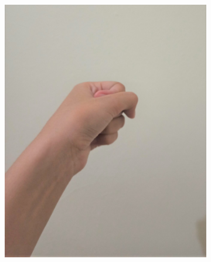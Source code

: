 \documentclass[conference]{IEEEtran}
\begin{document}
		\vspace{-2ex}
		\begin{figure} [h]
		\begin{center}
		\begin{subfigure}[t]{0.11\textwidth}
			\includegraphics[width=\textwidth]{img/pola1a.jpg}
			\caption{\label{fig:gs1a}}
		\end{subfigure}
		\hspace{0.1em}
		\begin{subfigure}[t]{0.11\textwidth}

\end{subfigure}
\end{center}
\end{figure}
\end{document}
